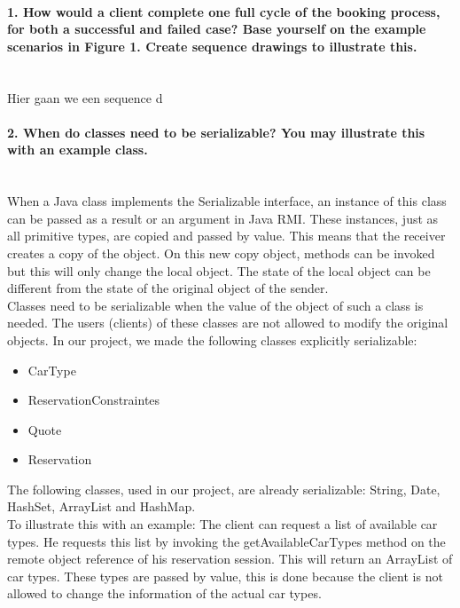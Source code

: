 \documentclass{ds-report}
\begin{document}
	\maketitle

	\paragraph{1. How would a client complete one full cycle of the booking process, for both a successful and
failed case? Base yourself on the example scenarios in Figure 1. Create sequence drawings to
illustrate this.} \mbox{}\\
	Hier gaan we een sequence d
	
	\paragraph{2. When do classes need to be serializable? You may illustrate this with an example class.} \mbox{}\\
When a Java class implements the Serializable interface, an instance of this class can be passed as a result or an argument in Java RMI. These instances, just as all primitive types, are copied and passed by value. This means that the receiver creates a copy of the object. On this new copy object, methods can be invoked but this will only change the local object. The state of the local object can be different from the state of the original object of the sender. \\
Classes need to be serializable when the value of the object of such a class is needed. The users (clients) of these classes are not allowed to modify the original objects. In our project, we made the following classes explicitly serializable:
\begin{itemize}
	\item CarType 
	\item ReservationConstraintes 
	\item Quote
	\item Reservation
\end{itemize}
The following classes, used in our project, are already serializable: String, Date, HashSet, ArrayList and HashMap.\\
To illustrate this with an example: The client can request a list of available car types. He requests this list by invoking the getAvailableCarTypes method on the remote object reference of his reservation session. This will return an ArrayList of car types. These types are passed by value, this is done because the client is not allowed to change the information of the actual car types.
\end{document}
